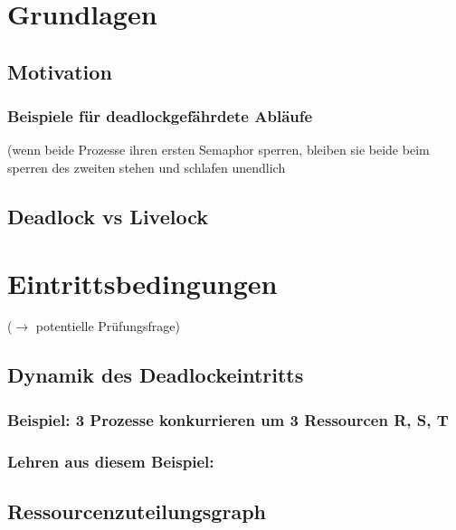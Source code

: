 \section{Grundlagen}
\subsection{Motivation}
\subsubsection*{Beispiele für deadlockgefährdete Abläufe}
(wenn beide Prozesse ihren ersten Semaphor sperren, bleiben sie beide beim sperren des zweiten stehen und schlafen unendlich
\subsection{Deadlock vs Livelock}

\section{Eintrittsbedingungen}
($\to$ potentielle Prüfungsfrage)

\subsection{Dynamik des Deadlockeintritts}
\subsubsection*{Beispiel: 3 Prozesse konkurrieren um 3 Ressourcen R, S, T}
\subsubsection*{Lehren aus diesem Beispiel:}
\subsection{Ressourcenzuteilungsgraph}
\begin{center}
\end{center}
